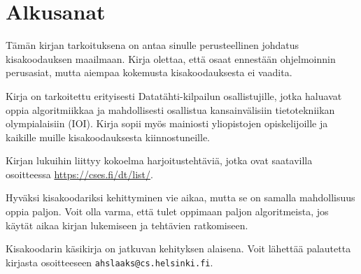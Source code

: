\chapter*{Alkusanat}

Tämän kirjan tarkoituksena on antaa sinulle
perusteellinen johdatus kisakoodauksen maailmaan.
Kirja olettaa, että osaat ennestään
ohjelmoinnin perusasiat, mutta aiempaa kokemusta
kisakoodauksesta ei vaadita.

Kirja on tarkoitettu erityisesti
Datatähti-kilpailun osallistujille,
jotka haluavat oppia algoritmiikkaa
ja mahdollisesti osallistua kansainvälisiin
tietotekniikan olympialaisiin (IOI).
Kirja sopii myös mainiosti 
yliopistojen opiskelijoille ja
kaikille muille kisakoodauksesta kiinnostuneille.

Kirjan lukuihin liittyy kokoelma harjoitustehtäviä,
jotka ovat saatavilla
osoitteessa \url{https://cses.fi/dt/list/}.

Hyväksi kisakoodariksi kehittyminen vie aikaa,
mutta se on samalla mahdollisuus oppia paljon.
Voit olla varma, että tulet oppimaan paljon
algoritmeista, jos käytät aikaa kirjan lukemiseen
ja tehtävien ratkomiseen.

Kisakoodarin käsikirja on jatkuvan kehityksen alaisena.
Voit lähettää palautetta kirjasta
osoitteeseen
\texttt{ahslaaks@cs.helsinki.fi}.
